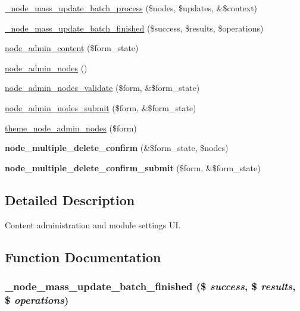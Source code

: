 \begin{CompactItemize}
\hyperlink{node_8admin_8inc_5960eac661f3d304ee9861fa25c53d80}{\_\-node\_\-mass\_\-update\_\-batch\_\-process} (\$nodes, \$updates, \&\$context)
\item 
\hyperlink{node_8admin_8inc_d95a05e860d4e44deb46b8af92a7fe25}{\_\-node\_\-mass\_\-update\_\-batch\_\-finished} (\$success, \$results, \$operations)
\item 
\hyperlink{node_8admin_8inc_267ebd4df592a90d86949c10ad1cae2c}{node\_\-admin\_\-content} (\$form\_\-state)
\item 
\hyperlink{node_8admin_8inc_3fb56c702a3c16eddd2fcd8ccd3e4adb}{node\_\-admin\_\-nodes} ()
\item 
\hyperlink{node_8admin_8inc_32a9ea91250aaf84de44f784a3569944}{node\_\-admin\_\-nodes\_\-validate} (\$form, \&\$form\_\-state)
\item 
\hyperlink{node_8admin_8inc_5f159cfed0d6cce65d5d70747efec391}{node\_\-admin\_\-nodes\_\-submit} (\$form, \&\$form\_\-state)
\item 
\hyperlink{group__themeable_g2601e8db30df61b351801e91a3de55b6}{theme\_\-node\_\-admin\_\-nodes} (\$form)
\item 
\hypertarget{node_8admin_8inc_019d40d5d9420f52f08f5d4facf84aac}{
\textbf{node\_\-multiple\_\-delete\_\-confirm} (\&\$form\_\-state, \$nodes)}
\label{node_8admin_8inc_019d40d5d9420f52f08f5d4facf84aac}

\item 
\hypertarget{node_8admin_8inc_b8a2e11edeef2797ca739f94d1eb1af9}{
\textbf{node\_\-multiple\_\-delete\_\-confirm\_\-submit} (\$form, \&\$form\_\-state)}
\label{node_8admin_8inc_b8a2e11edeef2797ca739f94d1eb1af9}

\end{CompactItemize}


\subsection{Detailed Description}
Content administration and module settings UI. 

\subsection{Function Documentation}
\hypertarget{node_8admin_8inc_d95a05e860d4e44deb46b8af92a7fe25}{
\subsubsection[{\_\-node\_\-mass\_\-update\_\-batch\_\-finished}]{\setlength{\rightskip}{0pt plus 5cm}\_\-node\_\-mass\_\-update\_\-batch\_\-finished (\$ {\em success}, \/  \$ {\em results}, \/  \$ {\em operations})}}
\label{node_8admin_8inc_d95a05e860d4e44deb46b8af92a7fe25}


